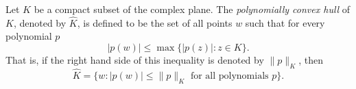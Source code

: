 Let $K$ be a compact subset of the complex plane. The \textit{polynomially convex hull} of $K$, denoted by $\hat{K}$, is defined to be the set of all points $w$ such that for every polynomial $p$
$$|p(w)| \leq \max \{|p(z)| : z \in K\}.$$
That is, if the right hand side of this inequality is denoted by $\|p\|_K$, then
$$\hat{K} = \{w : |p(w)| \leq \|p\|_K \text{ for all polynomials } p\}.$$
